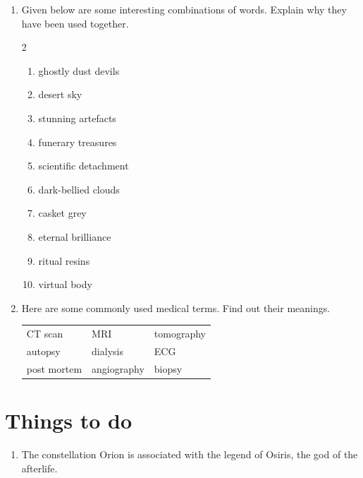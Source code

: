 \begin{enumerate}[label=\arabic*., leftmargin=*]
    \item Given below are some interesting combinations of words. Explain why they have been used together.
    
    \begin{multicols}{2}
    \begin{enumerate}[label=(\roman*)]
        \item ghostly dust devils
        \item desert sky
        \item stunning artefacts
        \item funerary treasures
        \item scientific detachment
        \item dark-bellied clouds
        \item casket grey
        \item eternal brilliance
        \item ritual resins
        \item virtual body
    \end{enumerate}
    \end{multicols}

    \item Here are some commonly used medical terms. Find out their meanings.
    
    \vspace{0.5em}
    \begin{center}
    \begin{tabular}{|lll|}
    \hline
    CT scan & MRI & tomography \\
    autopsy & dialysis & ECG \\
    post mortem & angiography & biopsy \\
    \hline
    \end{tabular}
    \end{center}
\end{enumerate}

\section*{Things to do}

\begin{enumerate}[label=\arabic*., leftmargin=*]
    \item The constellation Orion is associated with the legend of Osiris, the god of the afterlife.
\end{enumerate}


